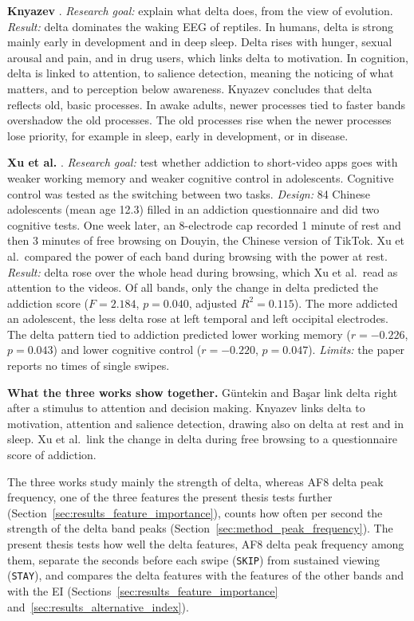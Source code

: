 \documentclass[12pt,a4paper]{report}
\begin{document}
\textbf{Knyazev} \cite{knyazev_eeg_2012}. \emph{Research goal:} explain what delta does, from the view of evolution. \emph{Result:} delta dominates the waking EEG of reptiles. In humans, delta is strong mainly early in development and in deep sleep. Delta rises with hunger, sexual arousal and pain, and in drug users, which links delta to motivation. In cognition, delta is linked to attention, to salience detection, meaning the noticing of what matters, and to perception below awareness. Knyazev concludes that delta reflects old, basic processes. In awake adults, newer processes tied to faster bands overshadow the old processes. The old processes rise when the newer processes lose priority, for example in sleep, early in development, or in disease.

\textbf{Xu et al.} \cite{xu_neural_2024}. \emph{Research goal:} test whether addiction to short-video apps goes with weaker working memory and weaker cognitive control in adolescents. Cognitive control was tested as the switching between two tasks. \emph{Design:} 84 Chinese adolescents (mean age 12.3) filled in an addiction questionnaire and did two cognitive tests. One week later, an 8-electrode cap recorded 1 minute of rest and then 3 minutes of free browsing on Douyin, the Chinese version of TikTok. Xu et al.\ compared the power of each band during browsing with the power at rest. \emph{Result:} delta rose over the whole head during browsing, which Xu et al.\ read as attention to the videos. Of all bands, only the change in delta predicted the addiction score ($F=2.184$, $p=0.040$, adjusted $R^2=0.115$). The more addicted an adolescent, the less delta rose at left temporal and left occipital electrodes. The delta pattern tied to addiction predicted lower working memory ($r=-0.226$, $p=0.043$) and lower cognitive control ($r=-0.220$, $p=0.047$). \emph{Limits:} the paper reports no times of single swipes.

\textbf{What the three works show together.} Güntekin and Başar link delta right after a stimulus to attention and decision making. Knyazev links delta to motivation, attention and salience detection, drawing also on delta at rest and in sleep. Xu et al.\ link the change in delta during free browsing to a questionnaire score of addiction.

The three works study mainly the strength of delta, whereas AF8 delta peak frequency, one of the three features the present thesis tests further (Section~\ref{sec:results_feature_importance}), counts how often per second the strength of the delta band peaks (Section~\ref{sec:method_peak_frequency}). The present thesis tests how well the delta features, AF8 delta peak frequency among them, separate the seconds before each swipe (\texttt{SKIP}) from sustained viewing (\texttt{STAY}), and compares the delta features with the features of the other bands and with the EI (Sections~\ref{sec:results_feature_importance} and~\ref{sec:results_alternative_index}).
\end{document}
